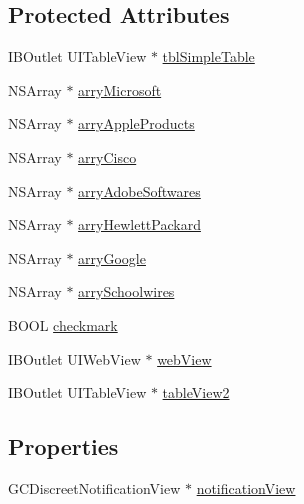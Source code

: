 \subsection*{\-Protected \-Attributes}
\begin{DoxyCompactItemize}
\item 
\-I\-B\-Outlet \-U\-I\-Table\-View $\ast$ \hyperlink{interface_push_schools_view_controller_ac2bc7ef5a88ea0ccb1a1b8dd308bae4b}{tbl\-Simple\-Table}
\item 
\-N\-S\-Array $\ast$ \hyperlink{interface_push_schools_view_controller_a1fd2b1e0b2ab154e82e610762f38876a}{arry\-Microsoft}
\item 
\-N\-S\-Array $\ast$ \hyperlink{interface_push_schools_view_controller_a11135fba7602114a3a492d4a41b9e972}{arry\-Apple\-Products}
\item 
\-N\-S\-Array $\ast$ \hyperlink{interface_push_schools_view_controller_aceebabceced7212c4bea6d71a9779c63}{arry\-Cisco}
\item 
\-N\-S\-Array $\ast$ \hyperlink{interface_push_schools_view_controller_a8337edaac04806e9d6ed65dac03ffdd8}{arry\-Adobe\-Softwares}
\item 
\-N\-S\-Array $\ast$ \hyperlink{interface_push_schools_view_controller_a30e414f6093cedd3f60626a9fa0ac11e}{arry\-Hewlett\-Packard}
\item 
\-N\-S\-Array $\ast$ \hyperlink{interface_push_schools_view_controller_a9e14f2d603367a9536a22f74435039ef}{arry\-Google}
\item 
\-N\-S\-Array $\ast$ \hyperlink{interface_push_schools_view_controller_a6d91e2b1200b92e41d887bf78a144cf2}{arry\-Schoolwires}
\item 
\-B\-O\-O\-L \hyperlink{interface_push_schools_view_controller_a266ceba8d7f7bc2cb5941c616b89aca3}{checkmark}
\item 
\-I\-B\-Outlet \-U\-I\-Web\-View $\ast$ \hyperlink{interface_push_schools_view_controller_acc09d6a4230b708c98bd9448b4c9afea}{web\-View}
\item 
\-I\-B\-Outlet \-U\-I\-Table\-View $\ast$ \hyperlink{interface_push_schools_view_controller_ad9be7918cec196bc013cdeaa6c9c8fc5}{table\-View2}
\end{DoxyCompactItemize}
\subsection*{\-Properties}
\begin{DoxyCompactItemize}
\item 
\-G\-C\-Discreet\-Notification\-View $\ast$ \hyperlink{interface_push_schools_view_controller_aa8ddb5e5759527882b547052bd676204}{notification\-View}
\end{DoxyCompactItemize}


